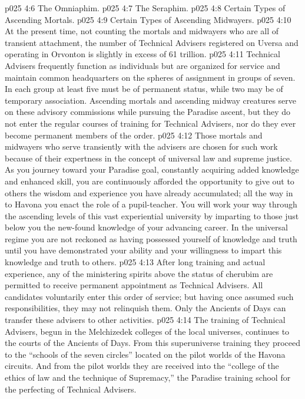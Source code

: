 \vs p025 4:6 \bibnobreakspace The Omniaphim.
\vs p025 4:7 \bibnobreakspace The Seraphim.
\vs p025 4:8 \bibnobreakspace Certain Types of Ascending Mortals.
\vs p025 4:9 \bibnobreakspace Certain Types of Ascending Midwayers.
\vs p025 4:10 \pc At the present time, not counting the mortals and midwayers who are all of transient attachment, the number of Technical Advisers registered on Uversa and operating in Orvonton is slightly in excess of 61 trillion.
\vs p025 4:11 Technical Advisers frequently function as individuals but are organized for service and maintain common headquarters on the spheres of assignment in groups of seven. In each group at least five must be of permanent status, while two may be of temporary association. Ascending mortals and ascending midway creatures serve on these advisory commissions while pursuing the Paradise ascent, but they do not enter the regular courses of training for Technical Advisers, nor do they ever become permanent members of the order.
\vs p025 4:12 Those mortals and midwayers who serve transiently with the advisers are chosen for such work because of their expertness in the concept of universal law and supreme justice. As you journey toward your Paradise goal, constantly acquiring added knowledge and enhanced skill, you are continuously afforded the opportunity to give out to others the wisdom and experience you have already accumulated; all the way in to Havona you enact the role of a pupil\hyp{}teacher. You will work your way through the ascending levels of this vast experiential university by imparting to those just below you the new\hyp{}found knowledge of your advancing career. In the universal regime you are not reckoned as having possessed yourself of knowledge and truth until you have demonstrated your ability and your willingness to impart this knowledge and truth to others.
\vs p025 4:13 After long training and actual experience, any of the ministering spirits above the status of cherubim are permitted to receive permanent appointment as Technical Advisers. All candidates voluntarily enter this order of service; but having once assumed such responsibilities, they may not relinquish them. Only the Ancients of Days can transfer these advisers to other activities.
\vs p025 4:14 \pc The training of Technical Advisers, begun in the Melchizedek colleges of the local universes, continues to the courts of the Ancients of Days. From this superuniverse training they proceed to the “schools of the seven circles” located on the pilot worlds of the Havona circuits. And from the pilot worlds they are received into the “college of the ethics of law and the technique of Supremacy,” the Paradise training school for the perfecting of Technical Advisers.
